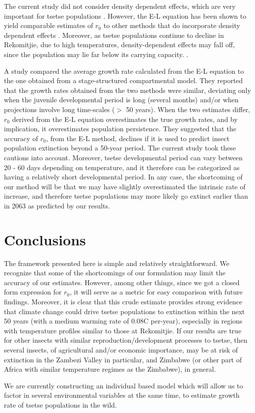 \documentclass[12pt,a4paper]{article}
\begin{document}
The current study did not consider density dependent effects, which are very important for tsetse populations \cite{Rogers1975}. However, the E-L equation has been shown to yield comparable estimates of $r_0$ to other methods that do incorporate density dependent effects \cite{Cortes2016}. Moreover, as tsetse populations continue to decline in Rekomitjie, due to high temperatures, density-dependent effects may fall off, since the population may lie far below its carrying capacity. . 


A study \cite{Amarasekare2013} compared the average growth rate calculated from the E-L equation to the one obtained from a stage-structured compartmental model. They reported that the growth rates obtained from the two methods were similar, deviating only when the juvenile developmental period is long (several months) and/or when projections involve long time-scales ($>$ 50 years).  When the two estimates differ, $r_0$ derived from the E-L equation overestimates the true growth rates, and by implication, it overestimates population persistence. They suggested that the accuracy of $r_0$, from the E-L method, declines if it is used to predict insect population extinction beyond a 50-year period.  The current study took these cautions into account. Moreover, tsetse developmental period can vary between 20 - 60 days depending on temperature, and it therefore can be categorized as having a relatively short developmental period. In any case, the shortcoming of our method will be that we may have slightly overestimated the intrinsic rate of increase, and therefore tsetse populations may more likely go extinct earlier than in 2063 as predicted by our results.
\section*{Conclusions}
The framework presented here is simple and relatively straightforward. We recognize that some of the shortcomings of our formulation may limit the accuracy of our estimates.  However, among other things, since we got a closed form expression for $r_0$, it will serve as a metric for easy comparison with future findings. Moreover, it is clear that this crude estimate provides strong evidence that climate change could drive tsetse populations to extinction within the next 50 years (with a medium warming rate of 0.08\textdegree C per-year), especially in regions with temperature profiles similar to those at Rekomitjie. If our results are true for other insects with similar reproduction/development processes to tsetse, then several insects, of agricultural and/or economic importance, may be at risk of extinction in the Zambezi Valley in particular, and Zimbabwe (or other part of Africa with similar temperature regimes as the Zimbabwe), in general. 

We are currently constructing an individual based model which will allow us to factor in several environmental variables at the same time, to estimate growth rate of tsetse populations in the wild. 



\nocite{*}

\end{document}
